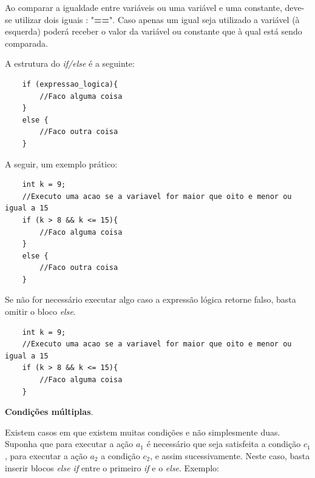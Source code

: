 \documentclass[12pt]{article}
\newcommand\tab[1][1cm]{\hspace*{#1}}
\begin{document}
\hspace{0.25cm}
\begin{tcolorbox}[colback=yellow!5!white,colframe=yellow!75!black,title=Atenção!]
  \par\tab Ao comparar a igualdade entre variáveis ou uma variável e uma constante, deve-se utilizar dois iguais : "\textbf{==}". Caso apenas um igual seja utilizado a variável (à esquerda) poderá receber o valor da variável ou constante que à qual está sendo comparada.
\end{tcolorbox}

\par\tab A estrutura do \textit{if/else} é a seguinte:

\hspace{0.25cm}
\begin{lstlisting}
    if (expressao_logica){
        //Faco alguma coisa
    }
    else {
        //Faco outra coisa
    }
\end{lstlisting}

\par\tab A seguir, um exemplo prático:

\hspace{0.25cm}
\begin{lstlisting}
    int k = 9;
    //Executo uma acao se a variavel for maior que oito e menor ou igual a 15
    if (k > 8 && k <= 15){
        //Faco alguma coisa
    }
    else {
        //Faco outra coisa
    }
\end{lstlisting}

\par\tab Se não for necessário executar algo caso a expressão lógica retorne falso, basta omitir o bloco \textit{else}.

\hspace{0.25cm}
\begin{lstlisting}
    int k = 9;
    //Executo uma acao se a variavel for maior que oito e menor ou igual a 15
    if (k > 8 && k <= 15){
        //Faco alguma coisa
    }
\end{lstlisting}

\par\tab\tab \textbf{Condições múltiplas}.

\par\tab Existem casos em que existem muitas condições e não simplesmente duas. Suponha que para executar a ação $a_1$ é necessário que seja satisfeita a condição $c_1$, para executar a ação $a_2$ a condição $c_2$, e assim sucessivamente. Neste caso, basta inserir blocos \textit{else if} entre o primeiro \textit{if} e o \textit{else}. Exemplo:
\end{document}

